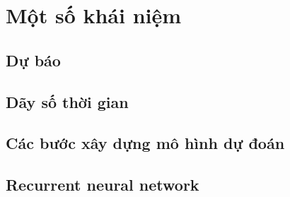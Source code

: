 %
\chapter{Một số khái niệm}
\label{sec:intro}

\section{Dự báo}
\label{sec:intro:dubao}


\section{Dãy số thời gian}
\label{sec:intro:timeseries}


\section{Các bước xây dựng mô hình dự đoán}
\label{sec:intro:buildmodel}


\section{Recurrent neural network}
\label{sec:intro:lstm}
